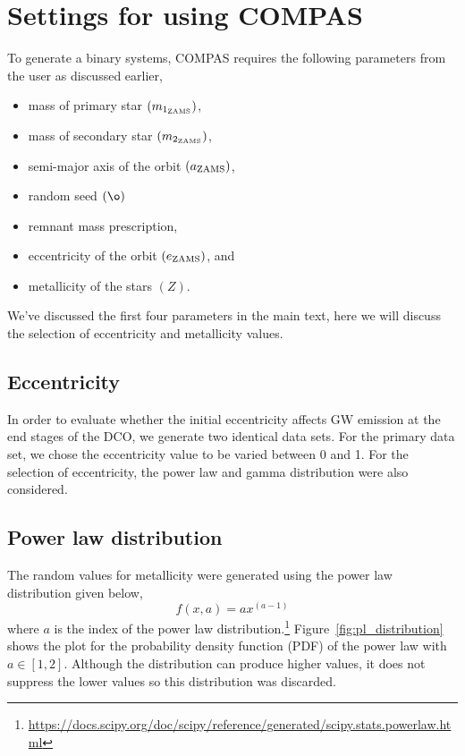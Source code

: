 \section{Settings for using COMPAS}
\label{sec:appA}
To generate a binary systems, COMPAS requires the following parameters from the user as discussed earlier,
\begin{itemize}
    \item mass of primary star $(m_{1_{\text{ZAMS}}})$,
    \item mass of secondary star $(m_{2_{\text{ZAMS}}})$,
    \item semi-major axis of the orbit $(a_{\text{ZAMS}})$,
    \item random seed $(\o)$
    \item remnant mass prescription,
    \item eccentricity of the orbit $(e_\text{ZAMS})$, and
    \item metallicity of the stars $\left(Z\right)$.
\end{itemize}

We've discussed the first four parameters in the main text, here we will discuss the selection of eccentricity and metallicity values.

\begin{center}%
    \section*{Eccentricity}
    \label{sec:eccentricity}
\end{center}%

In order to evaluate whether the initial eccentricity affects GW emission at the end stages of the DCO, we generate two identical data sets.
For the primary data set, we chose the eccentricity value to be varied between 0 and 1.
For the selection of eccentricity, the power law and gamma distribution were also considered.\@\\

\subsection{Power law distribution}
\label{subsec:power-law-distribution}
The random values for metallicity were generated using the power law distribution given below,
\begin{equation}
    f(x, a) = ax^{(a-1)}
    \label{eq:powerlaw_distribution}
\end{equation}
where $a$ is the index of the power law distribution.\footnote{\url{https://docs.scipy.org/doc/scipy/reference/generated/scipy.stats.powerlaw.html}}
Figure~\ref{fig:pl_distribution} shows the plot for the probability density function (PDF) of the power law with $a \in [1, 2]$.
Although the distribution can produce higher values, it does not suppress the lower values so this distribution was discarded.

